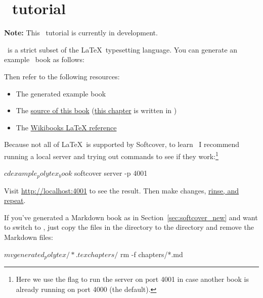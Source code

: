\chapter{\PolyTeX\ tutorial} %
\label{cha:polytex_tutorial}

\noindent \textbf{Note:} This \PolyTeX\ tutorial is currently in development.

\PolyTeX\ is a strict subset of the \LaTeX\ typesetting language. You can generate an example \PolyTeX\ book as follows:


\noindent Then refer to the following resources:

\begin{itemize}
\item The generated example book
\item The \href{https://github.com/softcover/softcover_book}{source of this book} (\href{https://github.com/softcover/softcover_book/blob/master/chapters/polytex_tutorial.tex}{this chapter} is written in \PolyTeX)
\item The \href{http://en.wikibooks.org/wiki/LaTeX}{Wikibooks LaTeX reference}
\end{itemize}

Because not all of \LaTeX\ is supported by Softcover, to learn \PolyTeX\ I recommend running a local server and trying out commands to see if they work:\footnote{Here we use the  flag to run the server on port 4001 in case another book is already running on port 4000 (the default).}

\begin{code}
$ cd example_polytex_book
$ softcover server -p 4001
\end{code}

\noindent Visit \href{http://localhost:4001}{http://localhost:4001} to see the result. Then make changes, \href{http://www.urbandictionary.com/define.php?term=rinse%20repeat}{rinse, and repeat}.

If you've generated a Markdown book as in Section~\ref{sec:softcover_new} and want to switch to \PolyTeX, just copy the files in the  directory to the  directory and remove the Markdown files:

\begin{code}
$ mv generated_polytex/*.tex chapters/
$ rm -f chapters/*.md
\end{code}


